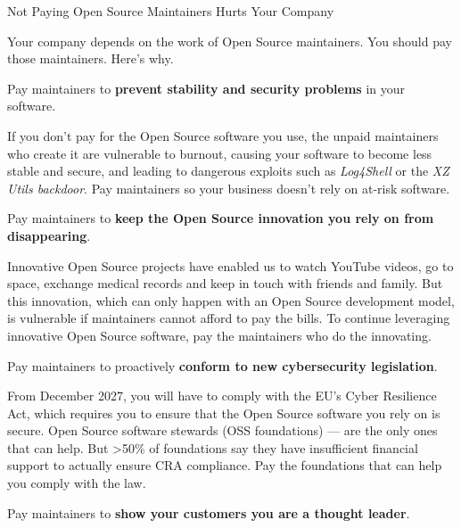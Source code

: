 \begin{multicols}{2}
\vspace{3mm}
{\renewcommand{\baselinestretch}{0.9}\Huge\raggedright Not Paying Open Source Maintainers Hurts Your Company\par}

Your company depends on the work of Open Source maintainers. You should pay those maintainers. Here's why.

\vspace{3mm}

 Pay maintainers to \textbf{prevent stability and security problems} in your software.

If you don't pay for the Open Source software you use, the unpaid maintainers who create it are vulnerable to burnout,
causing your software to become less stable and secure, and leading to dangerous exploits such as \textit{Log4Shell}
or the \textit{XZ Utils backdoor}. Pay maintainers so your business doesn't rely on at-risk software.

\vspace{3mm}

 Pay maintainers to \textbf{keep the Open Source innovation you rely on from disappearing}.

Innovative Open Source projects have enabled us to watch YouTube videos, go to space, exchange medical records and keep
in touch with friends and family. But this innovation, which can only happen with an Open Source development model, is
vulnerable if maintainers cannot afford to pay the bills. To continue leveraging innovative Open Source software, pay
the maintainers who do the innovating.

\vspace{3mm}

 Pay maintainers to proactively \textbf{conform to new cybersecurity legislation}.

From December 2027, you will have to comply with the EU's Cyber Resilience Act, which requires you to ensure that the
Open Source software you rely on is secure. Open Source software stewards (OSS foundations) — are the only ones that
can help. But >50\% of foundations say they have insufficient financial support to actually ensure CRA
compliance. Pay the foundations that can help you comply with the law.

\vspace{3mm}

 Pay maintainers to \textbf{show your customers you are a thought leader}.


\end{multicols}

